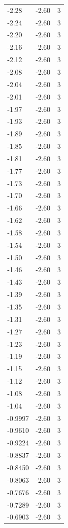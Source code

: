 \begin{longtable}{lrr}
  -2.28 & -2.60 & 3 \\
  -2.24 & -2.60 & 3 \\
  -2.20 & -2.60 & 3 \\
  -2.16 & -2.60 & 3 \\
  -2.12 & -2.60 & 3 \\
  -2.08 & -2.60 & 3 \\
  -2.04 & -2.60 & 3 \\
  -2.01 & -2.60 & 3 \\
  -1.97 & -2.60 & 3 \\
  -1.93 & -2.60 & 3 \\
  -1.89 & -2.60 & 3 \\
  -1.85 & -2.60 & 3 \\
  -1.81 & -2.60 & 3 \\
  -1.77 & -2.60 & 3 \\
  -1.73 & -2.60 & 3 \\
  -1.70 & -2.60 & 3 \\
  -1.66 & -2.60 & 3 \\
  -1.62 & -2.60 & 3 \\
  -1.58 & -2.60 & 3 \\
  -1.54 & -2.60 & 3 \\
  -1.50 & -2.60 & 3 \\
  -1.46 & -2.60 & 3 \\
  -1.43 & -2.60 & 3 \\
  -1.39 & -2.60 & 3 \\
  -1.35 & -2.60 & 3 \\
  -1.31 & -2.60 & 3 \\
  -1.27 & -2.60 & 3 \\
  -1.23 & -2.60 & 3 \\
  -1.19 & -2.60 & 3 \\
  -1.15 & -2.60 & 3 \\
  -1.12 & -2.60 & 3 \\
  -1.08 & -2.60 & 3 \\
  -1.04 & -2.60 & 3 \\
  -0.9997 & -2.60 & 3 \\
  -0.9610 & -2.60 & 3 \\
  -0.9224 & -2.60 & 3 \\
  -0.8837 & -2.60 & 3 \\
  -0.8450 & -2.60 & 3 \\
  -0.8063 & -2.60 & 3 \\
  -0.7676 & -2.60 & 3 \\
  -0.7289 & -2.60 & 3 \\
  -0.6903 & -2.60 & 3 \\

\end{longtable}
